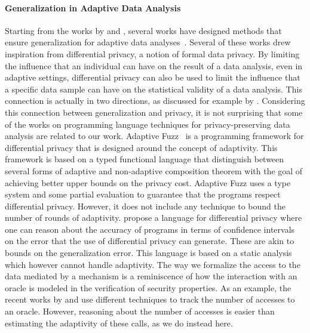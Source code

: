 \paragraph{Generalization in Adaptive Data Analysis}
Starting from the works by \citet{DworkFHPRR15} and \citet{HardtU14}, several works have designed methods that ensure generalization for adaptive data analyses~\cite{dwork2015reusable,dwork2015generalization,BassilyNSSSU16,UllmanSNSS18,FeldmanS17,jung2019new,SteinkeZ20,RogersRSSTW20}.
Several of these works drew inspiration from differential privacy, a notion of formal data privacy. By limiting the influence that an individual can have on the result of a data analysis, even in adaptive settings, differential privacy can also be used to limit the influence that a specific data sample can have on the statistical validity of a data analysis. This connection is actually in two directions, as discussed for example by \citet{YeomGFJ18}.
%
Considering this connection between generalization and privacy, it is not surprising that some of the works on programming language techniques for privacy-preserving data analysis are related to our work. 
Adaptive Fuzz~\cite{Winograd-CortHR17} is a programming framework for differential privacy that is designed around the concept of adaptivity. 
This framework is based on a typed functional language that distinguish between several forms of adaptive and non-adaptive composition theorem with the goal of achieving better upper bounds on the privacy cost. Adaptive Fuzz uses a type system and some partial evaluation to guarantee that the programs respect differential privacy. However, it does not include any technique to bound the number of rounds of adaptivity. 
\citet{lobo2021programming} propose a language for differential privacy where one can reason about the accuracy of programs in terms of confidence intervals on the error that the use of differential privacy can generate. These are akin to bounds on the generalization error. This language is based on a static analysis which however cannot handle adaptivity. 
%
The way we formalize the access to the data mediated by a mechanism is a reminiscence of how the interaction with an oracle is modeled in the verification of security properties. As an example, the recent works by \citet{BarbosaBGKS21} and \citet{AguirreBGGKS21} use different techniques to track the number of accesses to an oracle. However, reasoning about the number of accesses is easier than estimating the adaptivity of these calls, as we do instead here.


